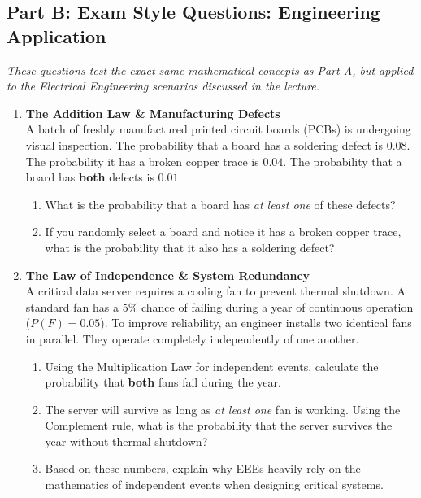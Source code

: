 \vspace{0.8cm}

\subsection*{Part B: Exam Style Questions: Engineering Application}
\textit{These questions test the exact same mathematical concepts as Part A, but applied to the Electrical Engineering scenarios discussed in the lecture.}

\begin{enumerate}[label=\textbf{Q\arabic*.}, leftmargin=*, start=3]

    \item \textbf{The Addition Law \& Manufacturing Defects} \\
    A batch of freshly manufactured printed circuit boards (PCBs) is undergoing visual inspection. The probability that a board has a soldering defect is $0.08$. The probability it has a broken copper trace is $0.04$. The probability that a board has \textbf{both} defects is $0.01$.
    \begin{enumerate}[label=\arabic*.]
        \item What is the probability that a board has \textit{at least one} of these defects?
        \item If you randomly select a board and notice it has a broken copper trace, what is the probability that it also has a soldering defect?
    \end{enumerate}
    \vspace{0.3cm}

    \item \textbf{The Law of Independence \& System Redundancy} \\
    A critical data server requires a cooling fan to prevent thermal shutdown. A standard fan has a $5\%$ chance of failing during a year of continuous operation ($P(F) = 0.05$). To improve reliability, an engineer installs two identical fans in parallel. They operate completely independently of one another.
    \begin{enumerate}[label=\arabic*.]
        \item Using the Multiplication Law for independent events, calculate the probability that \textbf{both} fans fail during the year.
        \item The server will survive as long as \textit{at least one} fan is working. Using the Complement rule, what is the probability that the server survives the year without thermal shutdown?
        \item Based on these numbers, explain why EEEs heavily rely on the mathematics of independent events when designing critical systems.
    \end{enumerate}
    \vspace{0.3cm}


\end{enumerate}

